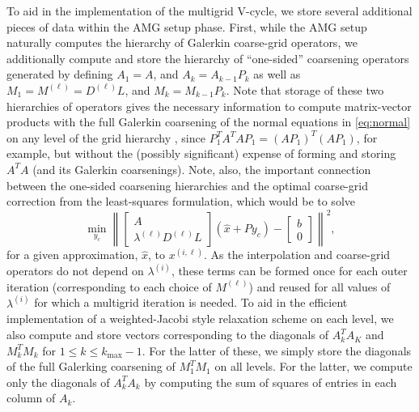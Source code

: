 To aid in the implementation of the multigrid V-cycle, we store
several additional pieces of data within the AMG setup phase.  First,
while the AMG setup naturally computes the hierarchy of Galerkin
coarse-grid operators, we additionally compute and store the hierarchy
of ``one-sided'' coarsening operators generated by defining $A_1 = A$,
and $A_k = A_{k-1}P_k$ as well as $M_1 = M^{(\ell)} = D^{(\ell)}L$,
and $M_k = M_{k-1}P_k$.  Note that storage of these two hierarchies of
operators gives the necessary information to compute matrix-vector
products with the full Galerkin coarsening of the normal equations
in \eqref{eq:normal} on any level of the grid hierarchy , since
$P_1^TA^TAP_1 = (AP_1)^T(AP_1)$, for example, but without the
(possibly significant) expense of forming and storing $A^TA$ (and its
Galerkin coarsenings).  Note, also, the important connection between
the one-sided coarsening hierarchies and the optimal coarse-grid
correction from the least-squares formulation, which would be to solve
\[
\min_{y_c}\left\| \left[\begin{array}{c} A \\ 
      \lambda^{(\ell)}D^{(\ell)}L\end{array}\right](\hat{x}+Py_c) - \left[\begin{array}{c} b \\ 0 \end{array}\right]\right\|^2,
\]
for a given approximation, $\hat{x}$, to $x^{(i,\ell)}$.  As the
interpolation and coarse-grid operators do not depend on
$\lambda^{(i)}$, these terms can be formed once for each outer
iteration (corresponding to each choice of $M^{(\ell)}$) and reused
for all values of $\lambda^{(i)}$ for which a multigrid iteration is
needed.  To aid in the efficient implementation of a weighted-Jacobi
style relaxation scheme on each level, we also compute and store
vectors corresponding to the diagonals of $A_k^TA_K$ and $M_k^TM_k$
for $1 \leq k \leq k_{\text{max}}-1$.  For the latter of these, we
simply store the diagonals of the full Galerking coarsening of
$M_1^TM_1$ on all levels.  For the latter, we compute only the
diagonals of $A_k^TA_k$ by computing the sum of squares of entries in
each column of $A_k$.


